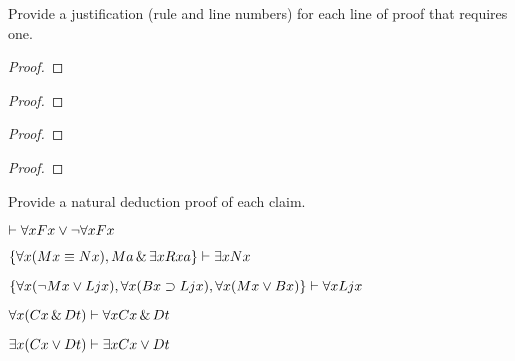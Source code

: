 \solutions
\problempart
\label{pr.justifyQLproof}
Provide a justification (rule and line numbers) for each line of proof that requires one.
\begin{multicols}{2}
\begin{proof}
	\open
	\close
{} {}
\end{proof}

\begin{proof}
 {}
 {}
\end{proof}


\begin{proof}
\open
\close
{}
\end{proof}


\begin{proof}
	\open
	\close
{} {}
\end{proof}
\end{multicols}

\solutions
\problempart
\label{pr.someQLproofs}
Provide a natural deduction proof of each claim.
\begin{earg}
\item $\vdash \forall x Fx \vee \neg \forall x Fx$
\item $\{\forall x(Mx \equiv Nx), Ma\,\&\,\exists x Rxa\}\vdash \exists x Nx$
\item $\{\forall x(\neg Mx \vee Ljx), \forall x(Bx\supset Ljx), \forall x(Mx\vee Bx)\}\vdash \forall xLjx$
\item $\forall x(Cx \,\&\, Dt)\vdash \forall xCx \,\&\, Dt$
\item $\exists x(Cx \vee Dt)\vdash \exists x Cx \vee Dt$
\end{earg}

